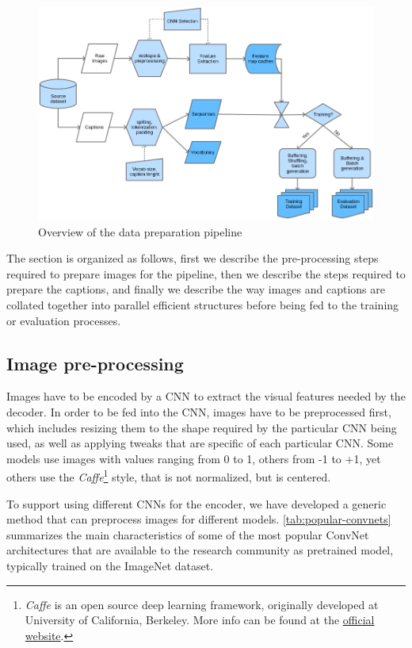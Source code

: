 \begin{figure}[hpt]
	\centering
	\includegraphics[scale=0.5]{images/ch4/data-pipelines.png}
	\caption{Overview of the data preparation pipeline}
	\label{fig:data-pipelines}
\end{figure}

The section is organized as follows, first we describe the pre-processing steps required to prepare images for the pipeline, then we describe the steps required to prepare the captions, and finally we describe the way images and captions are collated together into parallel efficient structures before being fed to the training or evaluation processes.

\subsection{Image pre-processing}

Images have to be encoded by a CNN to extract the visual features needed by the decoder. In order to be fed into the CNN, images have to be preprocessed first, which includes resizing them to the shape required by the particular CNN being used, as well as applying tweaks that are specific of each particular CNN. Some models use images with values ranging from 0 to 1, others from -1 to +1, yet others use the \textit{Caffe}\footnote{\textit{Caffe} is an open source deep learning framework, originally developed at University of California, Berkeley. More info can be found at the \href{http://caffe.berkeleyvision.org/}{official website}.} style, that is not normalized, but is centered. 

To support using different CNNs for the encoder, we have developed a generic method that can preprocess images for different models. \cref{tab:popular-convnets} summarizes the main characteristics of some of the most popular ConvNet architectures that are available to the research community as pretrained model, typically trained on the ImageNet dataset.

